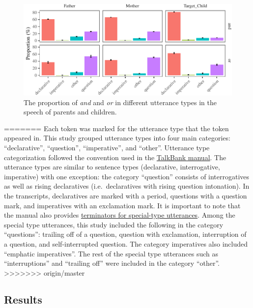 \documentclass[,man,floatsintext]{apa6}
\begin{document}
\begin{figure}[tb]

{\centering \includegraphics{figs/CnctPropbySpeechAct-1} 

}

\caption{The proportion of \textit{and} and \textit{or} in different utterance types in the speech of parents and children.}\label{fig:CnctPropbySpeechAct}
\end{figure}
=======
Each token was marked for the utterance type that the token appeared in. This study grouped utterance types into four main categories: \enquote{declarative}, \enquote{question}, \enquote{imperative}, and \enquote{other}. Utterance type categorization followed the convention used in the \href{https://talkbank.org/manuals/CHAT.html\#_Toc486414422}{TalkBank manual}. The utterance types are similar to sentence types (declarative, interrogative, imperative) with one exception: the category \enquote{question} consists of interrogatives as well as rising declaratives (i.e.~declaratives with rising question intonation). In the transcripts, declaratives are marked with a period, questions with a question mark, and imperatives with an exclamation mark. It is important to note that the manual also provides \href{https://talkbank.org/manuals/CHAT.html\#_Toc486414431}{terminators for special-type utterances}. Among the special type utterances, this study included the following in the category \enquote{questions}: trailing off of a question, question with exclamation, interruption of a question, and self-interrupted question. The category imperatives also included \enquote{emphatic imperatives}. The rest of the special type utterances such as \enquote{interruptions} and \enquote{trailing off} were included in the category \enquote{other}.
>>>>>>> origin/master

\hypertarget{study1results}{%
\subsection{Results}\label{study1results}}
\end{document}
